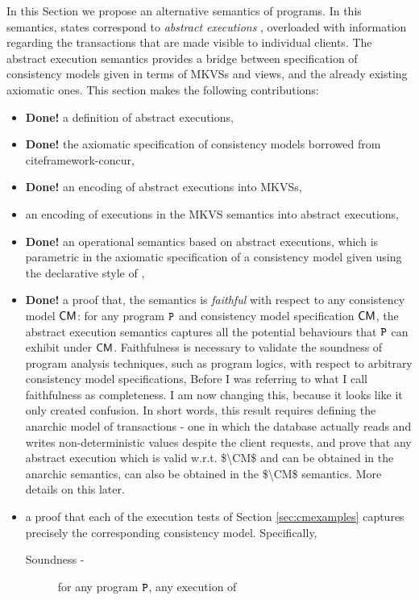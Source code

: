In this Section we propose an alternative 
semantics of programs. In this semantics, states 
correspond to \emph{abstract executions} \cite{framework-concur}, 
overloaded with information regarding the transactions that are made 
visible to individual clients. 
The abstract execution semantics provides a bridge between specification 
of consistency models given in terms of MKVSs and views, and the already 
existing axiomatic ones. This section makes the following contributions: 
\begin{itemize}
\item \textbf{Done!} a definition of abstract executions, 
\item \textbf{Done!} the axiomatic specification of consistency models borrowed from cite{framework-concur},
\item \textbf{Done!} an encoding of abstract executions into MKVSs, 
\item an encoding of executions in the MKVS semantics into abstract 
executions, 
\item \textbf{Done!} an operational semantics based on abstract executions, 
which is parametric in the axiomatic specification of a consistency model given using 
the declarative style of \cite{framework-concur,SIanalysis,laws}, 
\item \textbf{Done!} a proof that, the semantics is \emph{faithful} with respect to any consistency model $\CM$: 
for any program $\texttt{P}$ and consistency model specification $\CM$, 
the abstract execution semantics captures all the potential behaviours that $\texttt{P}$ can 
exhibit under $\CM$. Faithfulness is necessary to validate the soundness of 
program analysis techniques, such as program logics, with respect to arbitrary consistency model 
specifications,
\ac{Before I was referring to what I call faithfulness as completeness. I am now changing this, because 
it looks like it only created confusion. In short words, this result requires defining the anarchic model 
of transactions - one in which the database actually reads and writes non-deterministic values 
despite the client requests, and prove that any abstract execution which is 
valid w.r.t. $\CM$ and can be obtained in the anarchic semantics, can also be obtained 
in the $\CM$ semantics. More details on this later.} 
\item a proof that each of the execution tests of Section \ref{sec:cmexamples}
captures precisely the corresponding consistency model. Specifically,
\begin{description}
\item[Soundness - ] for any program $\texttt{P}$, any execution of 

\end{description}
\end{itemize}
